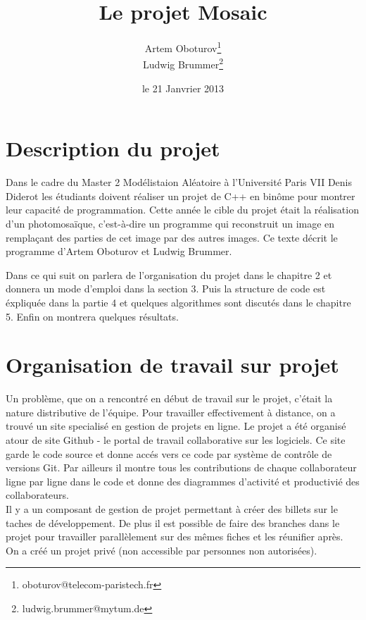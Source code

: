 \documentclass[a4paper]{article}
\begin{document}
\lstset{language=C++,tabsize=2, numbers=left}
\listoftodos

\title{Le projet Mosaic}
\author{
  Artem Oboturov\thanks{oboturov@telecom-paristech.fr}
  \\Ludwig Brummer\thanks{ludwig.brummer@mytum.de}
}
\date{le 21 Janvrier 2013}
\maketitle
\section{Description du projet}
Dans le cadre du Master 2 Mod\'elistaion Al\'eatoire \`a l'Universit\'e Paris VII Denis Diderot les \'etudiants  doivent r\'ealiser un projet de C++ en bin\^ome pour montrer leur capacit\'e de programmation.
Cette ann\'ee le cible du projet \'etait la r\'ealisation d'un photomosa\"ique, c'est-\`a-dire un programme qui reconstruit un image en rempla\c{c}ant des parties de cet image par des autres images.
Ce texte d\'ecrit le programme d'Artem Oboturov et Ludwig Brummer.

Dans ce qui suit on parlera de l'organisation du projet dans le chapitre 2 et donnera un mode d'emploi  dans la section 3. Puis la structure de code est \'expliqu\'ee dans la partie 4 et quelques algorithmes sont discut\'es dans le chapitre 5.
Enfin on montrera quelques r\'esultats. 

\section{Organisation de travail sur projet}
Un probl\`eme, que on a rencontr\'e en d\'ebut de travail sur le projet, c'\'etait la nature distributive de l'\'equipe.
Pour travailler effectivement \`a distance, on a trouv\'e un site specialis\'e en gestion de projets en ligne.
Le projet a \'et\'e organis\'e atour de site Github - le portal de travail collaborative sur les logiciels.
Ce site garde le code source et donne acc\'es vers ce code par syst\`eme de contr\^ole de versions Git. Par ailleurs il montre tous les contributions de chaque collaborateur ligne par ligne dans le code et donne des diagrammes d'activit\'e et productivi\'e des collaborateurs.\\
Il y a un composant de gestion de projet permettant \`a cr\'eer des billets sur le taches de d\'eveloppement.
De plus il est possible de faire des branches dans le projet pour travailler parallèlement sur des m\^emes fiches et les r\'eunifier apr\`es.\\
On a cr\'e\'e un projet priv\'e (non accessible par personnes non autoris\'ees).
\end{document}
